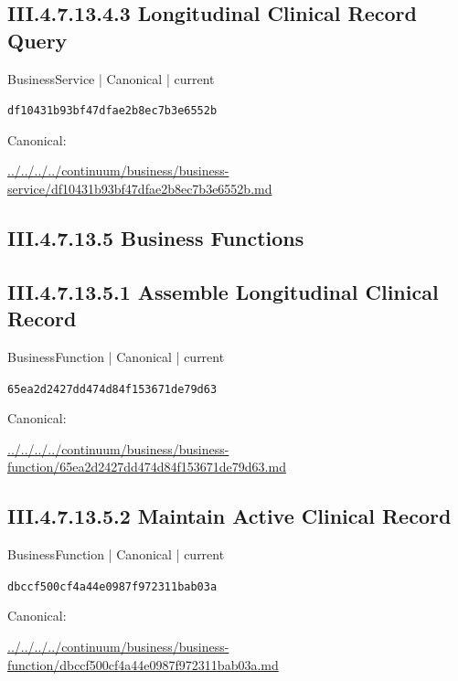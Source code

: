 \documentclass[10pt,a4paper]{article}
\begin{document}
\subsection*{III.4.7.13.4.3 Longitudinal Clinical Record Query}
\label{element-df10431b93bf47dfae2b8ec7b3e6552b}
{\small BusinessService | Canonical | current}\par
\texttt{df10431b93bf47dfae2b8ec7b3e6552b}\par
Canonical: \par
{\footnotesize\url{../../../../continuum/business/business-service/df10431b93bf47dfae2b8ec7b3e6552b.md}}\par
\subsection*{III.4.7.13.5 Business Functions}
\subsection*{III.4.7.13.5.1 Assemble Longitudinal Clinical Record}
\label{element-65ea2d2427dd474d84f153671de79d63}
{\small BusinessFunction | Canonical | current}\par
\texttt{65ea2d2427dd474d84f153671de79d63}\par
Canonical: \par
{\footnotesize\url{../../../../continuum/business/business-function/65ea2d2427dd474d84f153671de79d63.md}}\par
\subsection*{III.4.7.13.5.2 Maintain Active Clinical Record}
\label{element-dbccf500cf4a44e0987f972311bab03a}
{\small BusinessFunction | Canonical | current}\par
\texttt{dbccf500cf4a44e0987f972311bab03a}\par
Canonical: \par
{\footnotesize\url{../../../../continuum/business/business-function/dbccf500cf4a44e0987f972311bab03a.md}}\par
\end{document}
